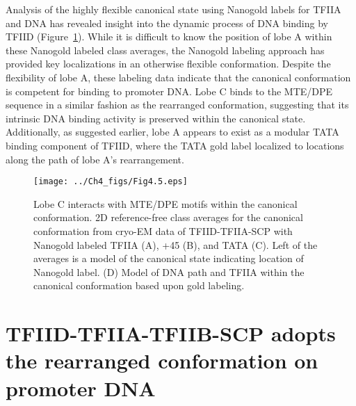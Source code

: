 \indent Analysis of the highly flexible canonical state using Nanogold labels for TFIIA and DNA has revealed insight into the dynamic process of DNA binding by TFIID (Figure~\ref{fig:Fig4.5}).  While it is difficult to know the position of lobe A within these Nanogold labeled class averages, the Nanogold labeling approach has provided key localizations in an otherwise flexible conformation. Despite the flexibility of lobe A, these labeling data indicate that the canonical conformation is competent for binding to promoter DNA. Lobe C binds to the MTE/DPE sequence in a similar fashion as the rearranged conformation, suggesting that its intrinsic DNA binding activity is preserved within the canonical state. Additionally, as suggested earlier, lobe A appears to exist as a modular TATA binding component of TFIID, where the TATA gold label localized to locations along the path of lobe A's rearrangement.\\ 
\begin{figure}
\centering
\texttt{[image: ../Ch4\_figs/Fig4.5.eps]}
\caption[Lobe C interacts with MTE/DPE motifs within the canonical conformation]{Lobe C interacts with MTE/DPE motifs within the canonical conformation. 2D reference-free class averages for the canonical conformation from cryo-EM data of TFIID-TFIIA-SCP with Nanogold labeled TFIIA (A), +45 (B), and TATA (C). Left of the averages is a model of the canonical state indicating location of Nanogold label. (D) Model of DNA path and TFIIA within the canonical conformation based upon gold labeling.}
\label{fig:Fig4.5}
\end{figure}

\section{TFIID-TFIIA-TFIIB-SCP adopts the rearranged conformation on promoter DNA}


